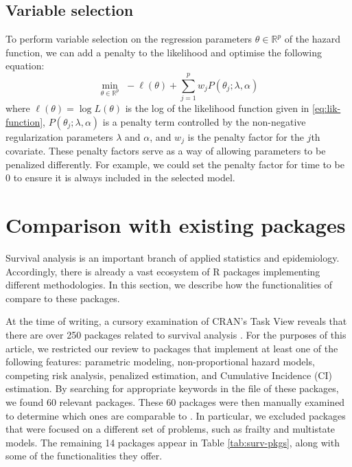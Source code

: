 \hypertarget{variable-selection}{%
\subsection{Variable selection}\label{variable-selection}}

To perform variable selection on the regression parameters
\(\theta \in \mathbb{R}^p\) of the hazard function, we can add a penalty
to the likelihood and optimise the following equation: \begin{equation}
\min _{\theta \in \mathbb{R}^{p}}\,\,-\ell\left(\theta\right)+\sum_{j=1}^p w_j P(\theta_j;\lambda,\alpha) \label{eq:penest}
\end{equation} where \(\ell\left(\theta\right) = \log L(\theta)\) is the
log of the likelihood function given in \eqref{eq:lik-function},
\(P(\theta_j;\lambda,\alpha)\) is a penalty term controlled by the
non-negative regularization parameters \(\lambda\) and \(\alpha\), and
\(w_j\) is the penalty factor for the \(j\)th covariate. These penalty
factors serve as a way of allowing parameters to be penalized
differently. For example, we could set the penalty factor for time to be
0 to ensure it is always included in the selected model.

\hypertarget{comparison-with-existing-packages}{%
\section{Comparison with existing
packages}\label{comparison-with-existing-packages}}

Survival analysis is an important branch of applied statistics and
epidemiology. Accordingly, there is already a vast ecosystem of R
packages implementing different methodologies. In this section, we
describe how the functionalities of  compare to these
packages.

At the time of writing, a cursory examination of CRAN's 
Task View reveals that there are over 250 packages related to survival
analysis \citep{survTaskView}. For the purposes of this article, we
restricted our review to packages that implement at least one of the
following features: parametric modeling, non-proportional hazard models,
competing risk analysis, penalized estimation, and Cumulative Incidence
(CI) estimation. By searching for appropriate keywords in the
 file of these packages, we found 60 relevant
packages. These 60 packages were then manually examined to determine
which ones are comparable to . In particular, we excluded
packages that were focused on a different set of problems, such as
frailty and multistate models. The remaining 14 packages appear in Table
\ref{tab:surv-pkgs}, along with some of the functionalities they offer.

